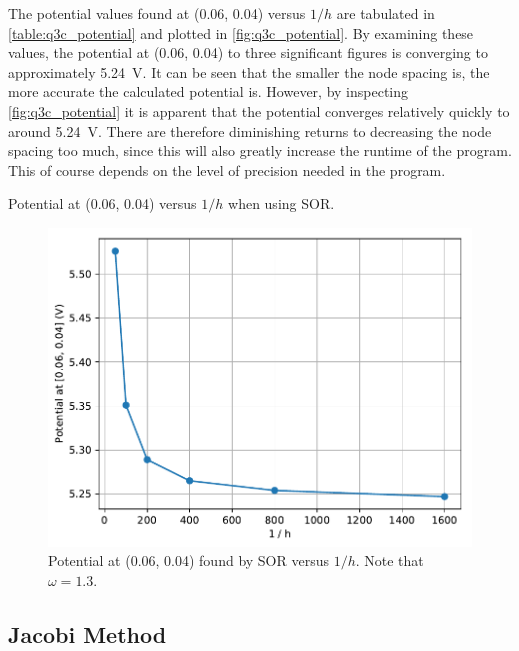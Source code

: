 \documentclass[a4paper,titlepage]{article}
\begin{document}
	The potential values found at (0.06, 0.04) versus $1/h$ are tabulated in \autoref{table:q3c_potential} and plotted in \autoref{fig:q3c_potential}. By examining these values, the potential at (0.06, 0.04) to three significant figures is converging to approximately \SI{5.24}{\volt}. It can be seen that the smaller the node spacing is, the more accurate the calculated potential is. However, by inspecting \autoref{fig:q3c_potential} it is apparent that the potential converges relatively quickly to around \SI{5.24}{\volt}. There are therefore diminishing returns to decreasing the node spacing too much, since this will also greatly increase the runtime of the program. This of course depends on the level of precision needed in the program.

	\begin{table}[!htb]
		\centering
		\caption{Potential at (0.06, 0.04) versus $1/h$ when using SOR.}
		\label{table:q3c_potential}
	\end{table}

	\begin{figure}[!htb]
		\centering
		\includegraphics[width=\columnwidth]{plots/q3c_potential.pdf}
		\caption
		{Potential at (0.06, 0.04) found by SOR versus $1/h$. Note that $\omega=1.3$.}
		\label{fig:q3c_potential}
	\end{figure}
	
	\subsection{Jacobi Method}
	
\end{document}
